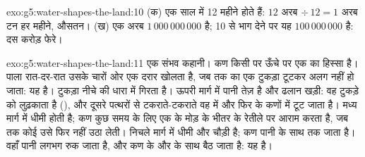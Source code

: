 \begin{solution}{exo:g5:water-shapes-the-land:10}
(क) एक साल में 12 महीने होते हैं: $12$ अरब $\div\, 12 = 1$ अरब टन हर महीने,
औसतन। (ख) एक अरब $1\,000\,000\,000$ है; 10 से भाग देने पर यह
$100\,000\,000$ है: दस करोड़ फेरे।
\end{solution}

\begin{solution}{exo:g5:water-shapes-the-land:11}
एक संभव कहानी। कण किसी  पर ऊँचे पर एक  का हिस्सा है। पाला रात-दर-रात
उसके चारों ओर एक दरार खोलता है, जब तक  का एक टुकड़ा टूटकर अलग नहीं हो
जाता: यह  है। टुकड़ा नीचे की धारा में गिरता है। ऊपरी मार्ग में पानी तेज़ है
और ढलान खड़ी: वह टुकड़े को लुढ़काता है (), और दूसरे पत्थरों से टकराते-टकराते
वह  में और फिर  के कणों में टूट जाता है। मध्य मार्ग में  धीमी होती
है; कण कुछ समय के लिए एक  के मोड़ के भीतर के रेतीले  पर आराम करता है,
जब तक कोई  उसे फिर नहीं उठा लेती। निचले मार्ग में  धीमी और चौड़ी है; कण
पानी के साथ  तक जाता है। वहाँ पानी लगभग रुक जाता है, और कण  के
 और  के साथ बैठ जाता है: यह  है।
\end{solution}
